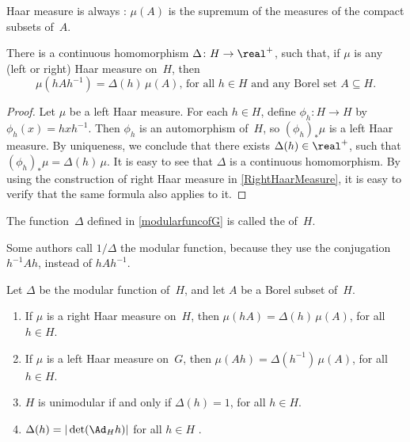 \begin{rem}
Haar measure is always : $\mu(A)$ is the supremum of the measures of the compact subsets of~$A$.
\end{rem}

\begin{prop} \label{modularfuncofG}
 There is a continuous homomorphism $\Delta \colon H \to \real^+$, such that, if $\mu$ is any \textup(left or right\textup) Haar measure on~$H$, then
 	$$ \text{$\mu(h A h^{-1}) = \Delta(h)\, \mu(A)$,
	 for all $h \in H$ and any Borel set $A \subseteq H$}
	 . $$
 \end{prop}

\begin{proof}
Let $\mu$ be a left Haar measure.
 For each $h \in H$, define $\phi_h \colon H \to H$ by $\phi_h(x) = h x h^{-1}$.
Then $\phi_h$ is an automorphism of~$H$, so $(\phi_h)_*\mu$
is a left Haar measure. By uniqueness, we
conclude that there exists $\Delta(h) \in \real^+$, such that
$(\phi_h)_*\mu = \Delta(h) \, \mu$. It is easy to see that
$\Delta$ is a continuous homomorphism. By using the construction of right Haar measure in \cref{RightHaarMeasure}, it is easy to verify that the same formula also applies to it.
 \end{proof} 

\begin{defn}
 The function~$\Delta$ 
 defined in \cref{modularfuncofG}
is called the  of~$H$.
 \end{defn}

\begin{terminology}
 Some authors call $1/\Delta$ the modular function, because
they use the conjugation $h^{-1} A h$, instead of $h A
h^{-1}$.
 \end{terminology}

\begin{cor}
 Let $\Delta$ be the modular function of~$H$, and let $A$ be a Borel subset of~$H$. 
 \begin{enumerate}
 \item If $\mu$ is a right Haar measure on~$H$, then
$\mu(hA) = \Delta(h)\, \mu(A)$, for all $h \in H$.
 \item If $\mu$ is a left Haar measure on~$G$, then
$\mu(Ah) = \Delta(h^{-1})\, \mu(A)$, for all $h \in H$.
 \item $H$ is unimodular if and only if $\Delta(h) = 1$, for
all $h \in H$. 
 \item $\Delta(h) = | \det (\Ad_H h)|$ for all $h \in H$ .
 \end{enumerate}
 \end{cor}

